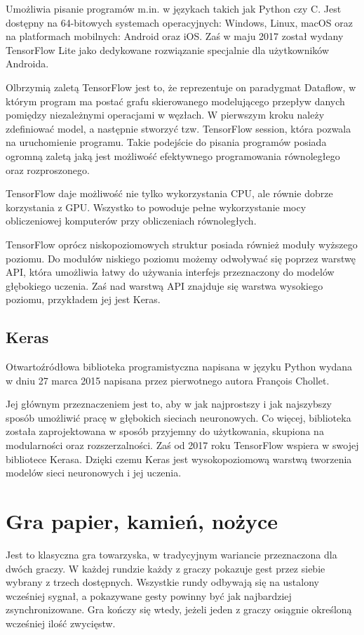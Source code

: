 \documentclass[a4paper,12pt,twoside,openany]{report}
\begin{document}
Umożliwia pisanie programów m.in. w językach takich jak Python czy C. Jest dostępny na 64-bitowych systemach operacyjnych: Windows, Linux, macOS oraz na platformach mobilnych: Android oraz iOS. Zaś w maju 2017 został wydany TensorFlow Lite jako dedykowane rozwiązanie specjalnie dla użytkowników Androida.

Olbrzymią zaletą TensorFlow jest to, że reprezentuje on paradygmat Dataflow, w którym program ma postać grafu skierowanego modelującego przepływ danych pomiędzy niezależnymi operacjami w węzłach. W pierwszym kroku należy zdefiniować model, a następnie stworzyć tzw. TensorFlow session, która pozwala na uruchomienie programu. Takie podejście do pisania programów posiada ogromną zaletą jaką jest możliwość efektywnego programowania równoległego oraz rozproszonego. 

TensorFlow daje możliwość nie tylko wykorzystania CPU, ale równie dobrze korzystania z GPU. Wszystko to powoduje pełne wykorzystanie mocy obliczeniowej komputerów przy obliczeniach równoległych.

TensorFlow oprócz niskopoziomowych struktur posiada również moduły wyższego poziomu. Do modułów niskiego poziomu możemy odwoływać się poprzez warstwę API, która umożliwia łatwy do używania interfejs przeznaczony do modelów głębokiego uczenia. Zaś nad warstwą API znajduje się warstwa wysokiego poziomu, przykładem jej jest Keras.

\section{Keras}
Otwartoźródłowa biblioteka programistyczna napisana w języku Python wydana w dniu 27 marca 2015 napisana przez pierwotnego autora François Chollet. 

Jej głównym przeznaczeniem jest to, aby w jak najprostszy i  jak najszybszy sposób umożliwić pracę w głębokich sieciach neuronowych. Co więcej, biblioteka została zaprojektowana w sposób przyjemny do użytkowania, skupiona na modularności oraz rozszerzalności. Zaś od 2017 roku TensorFlow wspiera w swojej bibliotece Kerasa. Dzięki czemu Keras jest wysokopoziomową warstwą tworzenia modelów sieci neuronowych i jej uczenia.

\chapter{Gra papier, kamień, nożyce}
Jest to klasyczna gra towarzyska, w tradycyjnym wariancie przeznaczona dla dwóch graczy. W każdej rundzie każdy z graczy pokazuje gest przez siebie wybrany z trzech dostępnych. Wszystkie rundy odbywają się na ustalony wcześniej sygnał, a pokazywane gesty powinny być jak najbardziej zsynchronizowane. Gra kończy się wtedy, jeżeli jeden z graczy osiągnie określoną wcześniej ilość zwycięstw.
\end{document}
